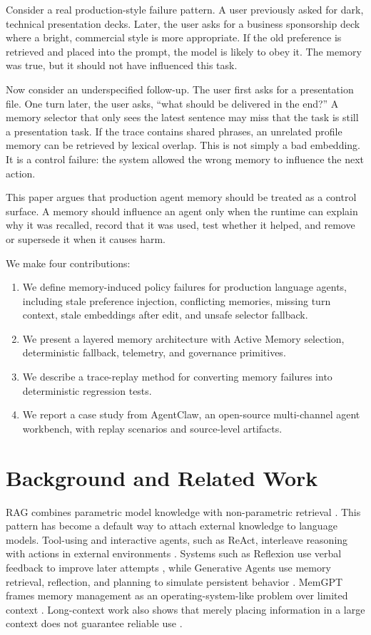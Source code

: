 \documentclass[11pt]{article}
\begin{document}
Consider a real production-style failure pattern. A user previously asked for
dark, technical presentation decks. Later, the user asks for a business
sponsorship deck where a bright, commercial style is more appropriate. If the old
preference is retrieved and placed into the prompt, the model is likely to obey
it. The memory was true, but it should not have influenced this task.

Now consider an underspecified follow-up. The user first asks for a presentation
file. One turn later, the user asks, ``what should be delivered in the end?'' A
memory selector that only sees the latest sentence may miss that the task is
still a presentation task. If the trace contains shared phrases, an unrelated
profile memory can be retrieved by lexical overlap. This is not simply a bad
embedding. It is a control failure: the system allowed the wrong memory to
influence the next action.

This paper argues that production agent memory should be treated as a control
surface. A memory should influence an agent only when the runtime can explain why
it was recalled, record that it was used, test whether it helped, and remove or
supersede it when it causes harm.

We make four contributions:
\begin{enumerate}[leftmargin=*]
  \item We define memory-induced policy failures for production language agents,
  including stale preference injection, conflicting memories, missing turn
  context, stale embeddings after edit, and unsafe selector fallback.
  \item We present a layered memory architecture with Active Memory selection,
  deterministic fallback, telemetry, and governance primitives.
  \item We describe a trace-replay method for converting memory failures into
  deterministic regression tests.
  \item We report a case study from AgentClaw, an open-source multi-channel agent
  workbench, with replay scenarios and source-level artifacts.
\end{enumerate}

\section{Background and Related Work}

RAG combines parametric model knowledge with non-parametric retrieval
\cite{lewis2020rag}. This pattern has become a default way to attach external
knowledge to language models. Tool-using and interactive agents, such as ReAct,
interleave reasoning with actions in external environments \cite{yao2023react}.
Systems such as Reflexion use verbal feedback to improve later attempts
\cite{shinn2023reflexion}, while Generative Agents use memory retrieval,
reflection, and planning to simulate persistent behavior \cite{park2023generative}.
MemGPT frames memory management as an operating-system-like problem over limited
context \cite{packer2023memgpt}. Long-context work also shows that merely placing
information in a large context does not guarantee reliable use
\cite{liu2023lost}.
\end{document}
